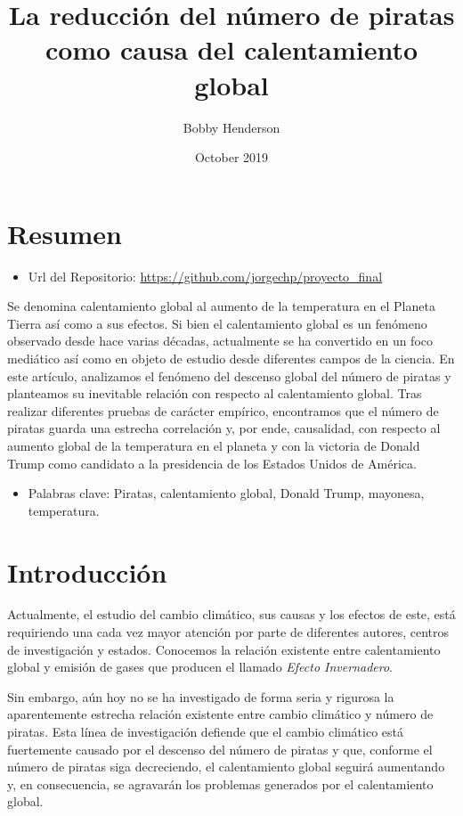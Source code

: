 \documentclass{article}
\title{La reducción del número de piratas como causa del calentamiento global}
\author{Bobby Henderson}
\date{October 2019}
\begin{document}
\maketitle

\section{Resumen}

\begin{itemize}
    \item Url del Repositorio: \url{https://github.com/jorgechp/proyecto_final}
\end{itemize}

Se denomina calentamiento global al aumento de la temperatura en el Planeta Tierra así como a sus efectos. Si bien el calentamiento global es un fenómeno observado desde hace varias décadas, actualmente se ha convertido en un foco mediático así como en objeto de estudio desde diferentes campos de la ciencia. En este artículo, analizamos el fenómeno del descenso global del número de piratas y planteamos su inevitable relación con respecto al calentamiento global. Tras realizar diferentes pruebas de carácter empírico, encontramos que el número de piratas guarda una estrecha correlación y, por ende, causalidad, con respecto al aumento global de la temperatura en el planeta y con la victoria de Donald Trump como candidato a la presidencia de los Estados Unidos de América. 

\begin{itemize}
	\item Palabras clave: Piratas, calentamiento global, Donald Trump, mayonesa, temperatura.
\end{itemize}

\section{Introducción}

Actualmente, el estudio del cambio climático, sus causas y los efectos de este, está requiriendo una cada vez mayor atención por parte de diferentes autores, centros de investigación y estados. Conocemos la relación existente entre calentamiento global y emisión de gases que producen el llamado \emph{Efecto Invernadero}. 

Sin embargo, aún hoy no se ha investigado de forma seria y rigurosa la aparentemente estrecha relación existente entre cambio climático y número de piratas. Esta línea de investigación defiende que el cambio climático está fuertemente causado por el descenso del número de piratas y que, conforme el número de piratas siga decreciendo, el calentamiento global seguirá aumentando y, en consecuencia, se agravarán los problemas generados por el calentamiento global.
\end{document}
